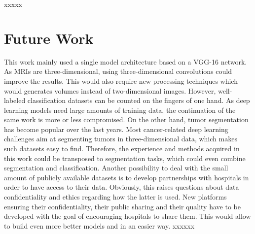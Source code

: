 xxxxx


\section{Future Work}

This work mainly used a single model architecture based on a VGG-16 network. As MRIs are three-dimensional, using three-dimensional convolutions could improve the results. This would also require new processing techniques which would generates volumes instead of two-dimensional images. However, well-labeled classification datasets can be counted on the fingers of one hand. As deep learning models need large amounts of training data, the continuation of the same work is more or less compromised. On the other hand, tumor segmentation has become popular over the last years. Most cancer-related deep learning challenges aim at segmenting tumors in three-dimensional data, which makes such datasets easy to find. Therefore, the experience and methods acquired in this work could be transposed to segmentation tasks, which could even combine segmentation and classification. Another possibility to deal with the small amount of publicly available datasets is to develop partnerships with hospitals in order to have access to their data. Obviously, this raises questions about data confidentiality and ethics regarding how the latter is used. New platforms ensuring their confidentiality, their public sharing and their quality have to be developed with the goal of encouraging hospitals to share them. This would allow to build even more better models and in an easier way.
xxxxxx

